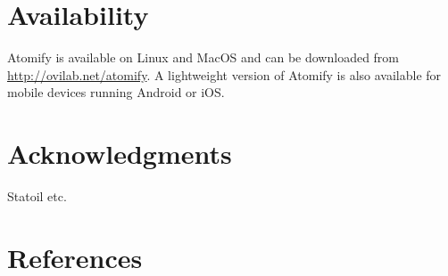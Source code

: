 \documentclass[12pt,a4paper,final]{iopart}
\begin{document}
\section{Availability}
Atomify is available on Linux and MacOS and can be downloaded from
\href{https://ovilab.net/atomify}{http://ovilab.net/atomify}.
A lightweight version of Atomify is also available for mobile devices running
Android or iOS.

\section{Acknowledgments}
Statoil etc.

\section*{References}


%


\end{document}
